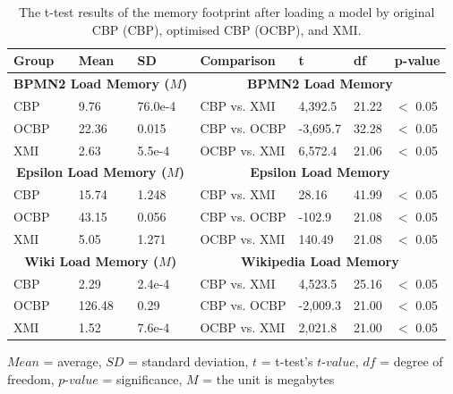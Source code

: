 {  
  \begin{table}[ht]
    \footnotesize
    \centering
    \caption{The t-test results of the memory footprint after loading a model by original CBP (CBP), optimised CBP (OCBP), and XMI.}
    \label{table:ttest_results_load_memory}
    \begin{tabular}
      {|p{}p{}p{}|p{}p{}p{}p{}|}
      \hline
      
      Group & Mean & SD & Comparison & t & df & p-value \\
      \hline
      \multicolumn{3}{|c|}{\textbf{BPMN2 Load Memory ($M$)}} & \multicolumn{4}{c|}{\textbf{BPMN2 Load Memory}} \\
      CBP & 9.76 & 76.0e-4 & CBP vs. XMI & 4,392.5 & 21.22 & $<$ 0.05 \\
      OCBP & 22.36 & 0.015 & CBP vs. OCBP & -3,695.7 & 32.28 & $<$ 0.05 \\
      XMI & 2.63 & 5.5e-4 & OCBP vs. XMI & 6,572.4 & 21.06 & $<$ 0.05 \\
      \hline
      
      \multicolumn{3}{|c|}{\textbf{Epsilon Load Memory ($M$)}} & \multicolumn{4}{c|}{\textbf{Epsilon Load Memory}} \\
      CBP &15.74 & 1.248 & CBP vs. XMI & 28.16 & 41.99 & $<$ 0.05 \\
      OCBP & 43.15 & 0.056 & CBP vs. OCBP & -102.9 &21.08 & $<$ 0.05 \\
      XMI & 5.05 & 1.271 & OCBP vs. XMI & 140.49 & 21.08 & $<$ 0.05 \\
      \hline
      
      \multicolumn{3}{|c|}{\textbf{Wiki Load Memory ($M$)}} & \multicolumn{4}{c|}{\textbf{Wikipedia Load Memory}} \\
      CBP & 2.29 & 2.4e-4 & CBP vs. XMI & 4,523.5 & 25.16 & $<$ 0.05 \\
      OCBP & 126.48 & 0.29 & CBP vs. OCBP & -2,009.3 & 21.00 & $<$ 0.05 \\
      XMI & 1.52 & 7.6e-4 & OCBP vs. XMI & 2,021.8 & 21.00 & $<$ 0.05 \\
      \hline
    \end{tabular}
    \justify
    $Mean$ = average, $SD$ = standard deviation, $t$ = t-test’s $t$-$value$, $df$ = degree of freedom, $p$-$value$ = significance, $M$ = the unit is megabytes
  \end{table}

}
